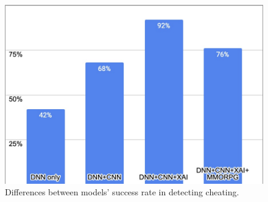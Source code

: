 \begin{figure}[h]
\centering
\includegraphics[width=0.8\linewidth]{images/success.jpeg}
\captionsetup{width=0.8\textwidth}
\caption{\label{fig:success}Differences between models' success rate in detecting cheating.}
\end{figure}



